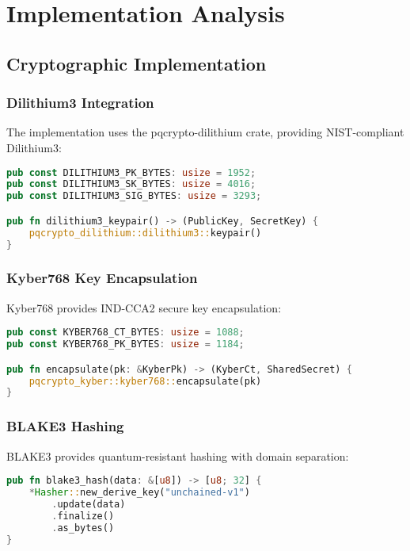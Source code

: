 \documentclass[12pt,a4paper]{article}
\begin{document}
\section{Implementation Analysis}

\subsection{Cryptographic Implementation}

\subsubsection{Dilithium3 Integration}

The implementation uses the pqcrypto-dilithium crate, providing NIST-compliant Dilithium3:

\begin{lstlisting}[language=Rust]
pub const DILITHIUM3_PK_BYTES: usize = 1952;
pub const DILITHIUM3_SK_BYTES: usize = 4016;
pub const DILITHIUM3_SIG_BYTES: usize = 3293;

pub fn dilithium3_keypair() -> (PublicKey, SecretKey) {
    pqcrypto_dilithium::dilithium3::keypair()
}
\end{lstlisting}

\subsubsection{Kyber768 Key Encapsulation}

Kyber768 provides IND-CCA2 secure key encapsulation:

\begin{lstlisting}[language=Rust]
pub const KYBER768_CT_BYTES: usize = 1088;
pub const KYBER768_PK_BYTES: usize = 1184;

pub fn encapsulate(pk: &KyberPk) -> (KyberCt, SharedSecret) {
    pqcrypto_kyber::kyber768::encapsulate(pk)
}
\end{lstlisting}

\subsubsection{BLAKE3 Hashing}

BLAKE3 provides quantum-resistant hashing with domain separation:

\begin{lstlisting}[language=Rust]
pub fn blake3_hash(data: &[u8]) -> [u8; 32] {
    *Hasher::new_derive_key("unchained-v1")
        .update(data)
        .finalize()
        .as_bytes()
}
\end{lstlisting}
\end{document}
